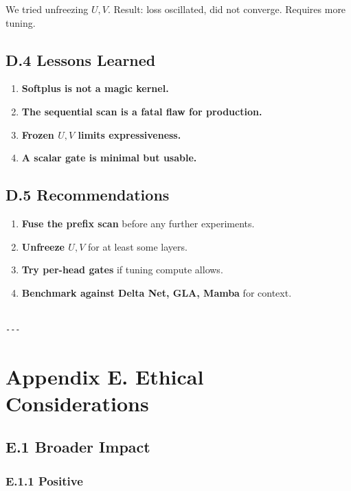 We tried unfreezing $U, V$. Result: loss oscillated, did not converge. 
Requires more tuning.

\subsection{D.4 Lessons Learned}

\begin{enumerate}
\item \textbf{Softplus is not a magic kernel.}
\item \textbf{The sequential scan is a fatal flaw for production.}
\item \textbf{Frozen $U, V$ limits expressiveness.}
\item \textbf{A scalar gate is minimal but usable.}

\end{enumerate}
\subsection{D.5 Recommendations}

\begin{enumerate}
\item \textbf{Fuse the prefix scan} before any further experiments.
\item \textbf{Unfreeze $U, V$} for at least some layers.
\item \textbf{Try per-head gates} if tuning compute allows.
\item \textbf{Benchmark against Delta Net, GLA, Mamba} for context.
\end{enumerate}
\begin{lstlisting}

---
\end{lstlisting}


\section{Appendix E. Ethical Considerations}

\subsection{E.1 Broader Impact}

\subsubsection{E.1.1 Positive}


